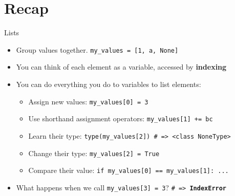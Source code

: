 

    \maketitle


    \section{Recap}
        \begin{frame}{Lists}
            \begin{itemize}
                \LARGE
                \item Group values together. \texttt{my\_values = [1, \textquotesingle a\textquotesingle, None]}
                \item You can think of each element as a variable, accessed by \textbf{indexing}
                \item You can do everything you do to variables to list elements:
                    \begin{itemize}
                        \Large
                        \item Assign new values: \texttt{my\_values[0] = 3}
                        \item Use shorthand assignment operators: \texttt{my\_values[1] += \textquotesingle bc\textquotesingle}
                        \item Learn their type: \texttt{type(my\_values[2]) \# => <class \textquotesingle NoneType\textquotesingle>}
                        \item Change their type: \texttt{my\_values[2] = True}
                        \item Compare their value: \texttt{if my\_values[0] == my\_values[1]: ...}
                    \end{itemize}
                \item What happens when we call \texttt{my\_values[3] = 3}? \texttt{\# => \textbf{IndexError}}
            \end{itemize}
        \end{frame}

